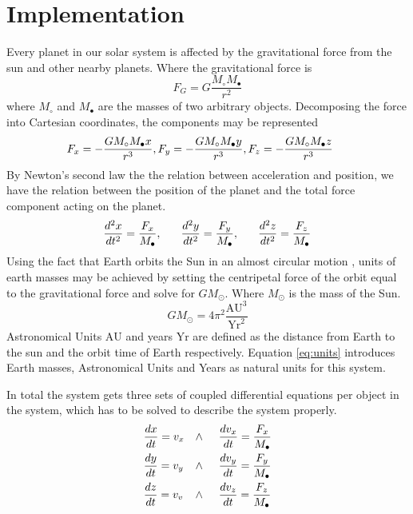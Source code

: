 \documentclass[twoside,twocolumn]{article}
\newcommand{\nl}{
	
	\medskip
	\noindent
}
\newcommand{\sun}{\odot}
\newcommand{\planet}{\bullet}
\newcommand{\AU}{\text{AU}}
\newcommand{\Yr}{\text{Yr}}
\begin{document}
\section{Implementation}
\label{sec:implementation}
Every planet in our solar system is affected by the gravitational force from the sun and other nearby planets. Where the gravitational force is
\begin{equation}
F_{G}=G\frac{M_\circ M_\planet}{r^2}
\end{equation} 
where $M_\circ$ and $M_\planet$ are the masses of two arbitrary objects. Decomposing the force into Cartesian coordinates, the components may be represented
\begin{equation*}
\hspace{-0.5cm}F_x=-\frac{GM_\circ M_\planet x}{r^3},F_y=-\frac{GM_\circ M_\planet y}{r^3},F_z=-\frac{GM_\circ M_\planet z}{r^3}
\end{equation*}
By Newton's second law the the relation between acceleration and position, we have the relation between the position of the planet and the total force component acting on the planet.
\begin{equation*}
\frac{d^2x}{dt^2}=\frac{F_x}{M_\planet},\hspace{0.6cm}\frac{d^2y}{dt^2}=\frac{F_y}{M_\planet},\hspace{0.6cm}\frac{d^2z}{dt^2}=\frac{F_z}{M_\planet}
\end{equation*}
Using the fact that Earth orbits the Sun in an almost circular motion \citep{NASA:orbit}, units of earth masses may be achieved by setting the centripetal force of the orbit equal to the gravitational force and solve for $GM_\sun$. Where $M_\sun$ is the mass of the Sun.
\begin{equation}
GM_\sun = 4\pi^2 \frac{\AU^3}{\Yr^2} \label{eq:units}
\end{equation}
Astronomical Units $\AU$ and years $\Yr$ are defined as the distance from Earth to the sun and the orbit time of Earth respectively. Equation \ref{eq:units} introduces Earth masses, Astronomical Units and Years as natural units for this system.\nl
In total the system gets three sets of coupled differential equations per object in the system, which has to be solved to describe the system properly.
\begin{align}
&\frac{dx}{dt}=v_x &\wedge \hspace{0.5cm} &\frac{dv_x}{dt}=\frac{F_x}{M_\planet}\label{eq:set_x}\\
&\frac{dy}{dt}=v_y &\wedge \hspace{0.5cm} &\frac{dv_y}{dt}=\frac{F_y}{M_\planet}\label{eq:set_y}\\
&\frac{dz}{dt}=v_v &\wedge \hspace{0.5cm} &\frac{dv_z}{dt}=\frac{F_z}{M_\planet}\label{eq:set_z}
\end{align}
\end{document}
